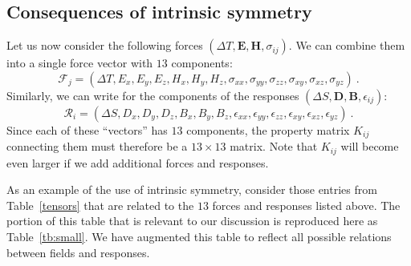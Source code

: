 \subsection{Consequences of intrinsic symmetry}
Let us now consider the following forces $(\Delta T,\mathbf{E},\mathbf{H},\sigma_{ij})$. We can combine them into a single force vector with $13$ components:
\begin{equation}
	\mathcal{F}_j = (\Delta T, E_x, E_y, E_z, H_x, H_y, H_z, \sigma_{xx},\sigma_{yy},\sigma_{zz},\sigma_{xy},\sigma_{xz},
	\sigma_{yz})\ .
\end{equation}
Similarly, we can write for the components of the responses $(\Delta S,\mathbf{D},\mathbf{B},\epsilon_{ij})$:
\begin{equation}
	\mathcal{R}_i = (\Delta S,D_x,D_y,D_z,B_x,B_y,B_z,\epsilon_{xx},\epsilon_{yy},\epsilon_{zz},\epsilon_{xy},\epsilon_{xz},
	\epsilon_{yz})\ .
\end{equation}
Since each of these ``vectors'' has $13$ components, the property matrix $K_{ij}$ connecting them must therefore be a $13\times 13$ matrix.  Note that $K_{ij}$ will become even larger if we add additional forces and responses.

As an example of the use of intrinsic symmetry, consider those entries from Table~\ref{tensors} that are related to the $13$ forces and responses listed above.  The portion of this table that is relevant to our discussion is reproduced here as Table~\ref{tb:small}.  We have augmented this table to reflect all possible relations between fields and responses.

